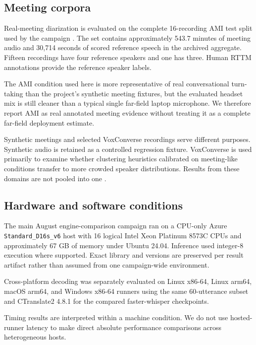 \subsection{Meeting corpora}

Real-meeting diarization is evaluated on the complete 16-recording AMI test split used by the
campaign \citep{carletta2005ami}. The set contains approximately 543.7 minutes of meeting audio
and 30,714 seconds of scored reference speech in the archived aggregate. Fifteen recordings have
four reference speakers and one has three. Human RTTM annotations provide the reference speaker
labels.

The AMI condition used here is more representative of real conversational turn-taking than the
project's synthetic meeting fixtures, but the evaluated headset mix is still cleaner than a
typical single far-field laptop microphone. We therefore report AMI as real annotated meeting
evidence without treating it as a complete far-field deployment estimate.

Synthetic meetings and selected VoxConverse recordings serve different purposes. Synthetic audio
is retained as a controlled regression fixture. VoxConverse is used primarily to examine whether
clustering heuristics calibrated on meeting-like conditions transfer to more crowded speaker
distributions. Results from these domains are not pooled into one \der{}.

\subsection{Hardware and software conditions}

The main August engine-comparison campaign ran on a CPU-only Azure
\texttt{Standard\_D16s\_v6} host with 16 logical Intel Xeon Platinum 8573C CPUs and
approximately 67 GB of memory under Ubuntu 24.04. Inference used integer-8 execution where
supported. Exact library and \YazSes{} versions are preserved per result artifact rather than
assumed from one campaign-wide environment.

Cross-platform decoding was separately evaluated on Linux x86-64, Linux arm64, macOS arm64, and
Windows x86-64 runners using the same 60-utterance subset and CTranslate2 4.8.1 for the compared
faster-whisper checkpoints.

Timing results are interpreted within a machine condition. We do not use hosted-runner latency to
make direct absolute performance comparisons across heterogeneous hosts.

